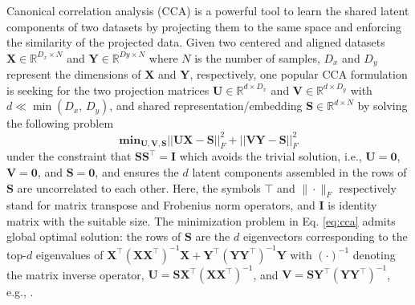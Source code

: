 
Canonical correlation analysis (CCA) is a powerful tool to learn the shared latent components of two datasets by projecting them to the same space and enforcing the similarity of the projected data. Given two centered and aligned datasets $\mathbf{X}\in \mathbb{R}^{D_x \times N}$ and $\mathbf{Y}\in \mathbb{R}^{Dy \times N}$ where $N$ is the number of samples, $D_x$ and $D_y$ represent the dimensions of $\mathbf{X}$ and $\mathbf{Y}$, respectively, one popular CCA formulation is seeking for the two projection matrices $\mathbf{U}\in\mathbb{R}^{d\times D_x}$ and $\mathbf{V}\in\mathbb{R}^{d\times D_y}$ with $d\ll \min (D_x,\,D_y)$, and shared representation/embedding $\mathbf{S}\in\mathbb{R}^{d \times N}$ by solving the following  problem
\begin{equation}
    {\textbf{min}}_{\mathbf{U,V,S}} || \mathbf{UX} - \mathbf{S} ||^{2}_{F} + || \mathbf{VY} - \mathbf{S} ||^{2}_{F}
 \label{eq:cca}
\end{equation}
\noindent under the constraint that $\mathbf{S}\mathbf{S}^\top=\mathbf{I}$ which avoids the trivial solution, i.e., $\mathbf{U}=\mathbf{0}$, $\mathbf{V}=\mathbf{0}$, and $\mathbf{S}=\mathbf{0}$, and ensures the $d$ latent components assembled in the rows of $\mathbf{S}$ are uncorrelated to each other. Here, the symbols $\top$ and $\|\cdot\|_F$ respectively stand for matrix transpose and Frobenius norm operators, and $\mathbf{I}$ is identity matrix with the suitable size. The minimization problem in Eq. \eqref{eq:cca} admits global optimal solution: the rows of $\mathbf{S}$ are the $d$ eigenvectors corresponding to the top-$d$ eigenvalues of $\mathbf{X}^\top(\mathbf{X}\mathbf{X}^\top)^{-1}\mathbf{X}+\mathbf{Y}^\top(\mathbf{Y}\mathbf{Y}^\top)^{-1}\mathbf{Y}$ with $(\cdot)^{-1}$ denoting the matrix inverse operator, $\mathbf{U} = \mathbf{S}\mathbf{X}^\top
(\mathbf{X}\mathbf{X}^\top)^{-1}$, and $\mathbf{V} =\mathbf{S}\mathbf{Y}^\top (\mathbf{Y}\mathbf{Y}^\top)^{-1}$, e.g., \cite{harold1936relations}.